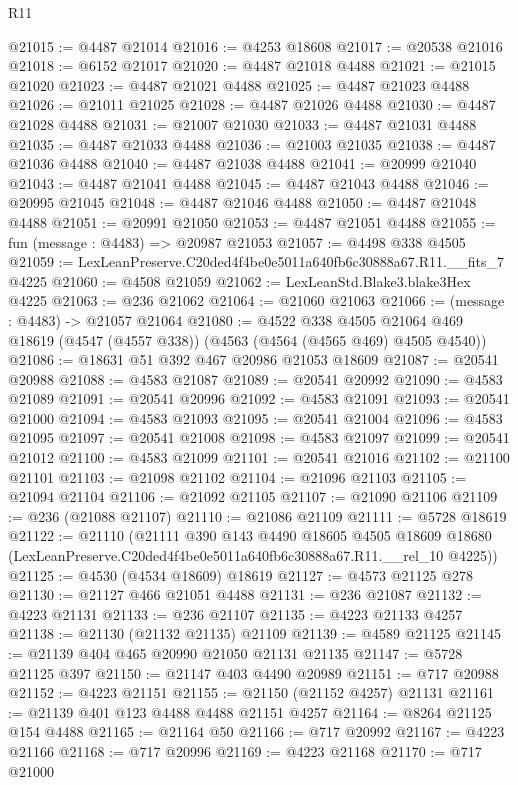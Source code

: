 \begin{lexlean}{R11}
\begin{coremodule}
@21015 := @4487 @21014
@21016 := @4253 @18608
@21017 := @20538 @21016
@21018 := @6152 @21017
@21020 := @4487 @21018 @4488
@21021 := @21015 @21020
@21023 := @4487 @21021 @4488
@21025 := @4487 @21023 @4488
@21026 := @21011 @21025
@21028 := @4487 @21026 @4488
@21030 := @4487 @21028 @4488
@21031 := @21007 @21030
@21033 := @4487 @21031 @4488
@21035 := @4487 @21033 @4488
@21036 := @21003 @21035
@21038 := @4487 @21036 @4488
@21040 := @4487 @21038 @4488
@21041 := @20999 @21040
@21043 := @4487 @21041 @4488
@21045 := @4487 @21043 @4488
@21046 := @20995 @21045
@21048 := @4487 @21046 @4488
@21050 := @4487 @21048 @4488
@21051 := @20991 @21050
@21053 := @4487 @21051 @4488
@21055 := fun (message : @4483) => @20987 @21053
@21057 := @4498 @338 @4505
@21059 := LexLeanPreserve.C20ded4f4be0e5011a640fb6c30888a67.R11.__fits_7 @4225
@21060 := @4508 @21059
@21062 := LexLeanStd.Blake3.blake3Hex @4225
@21063 := @236 @21062
@21064 := @21060 @21063
@21066 := (message : @4483) -> @21057 @21064
@21080 := @4522
    @338
    @4505
    @21064
    @469
    @18619
    (@4547 (@4557 @338))
    (@4563 (@4564 (@4565 @469) @4505 @4540))
@21086 := @18631 @51 @392 @467 @20986 @21053 @18609
@21087 := @20541 @20988
@21088 := @4583 @21087
@21089 := @20541 @20992
@21090 := @4583 @21089
@21091 := @20541 @20996
@21092 := @4583 @21091
@21093 := @20541 @21000
@21094 := @4583 @21093
@21095 := @20541 @21004
@21096 := @4583 @21095
@21097 := @20541 @21008
@21098 := @4583 @21097
@21099 := @20541 @21012
@21100 := @4583 @21099
@21101 := @20541 @21016
@21102 := @21100 @21101
@21103 := @21098 @21102
@21104 := @21096 @21103
@21105 := @21094 @21104
@21106 := @21092 @21105
@21107 := @21090 @21106
@21109 := @236 (@21088 @21107)
@21110 := @21086 @21109
@21111 := @5728 @18619
@21122 := @21110
    (@21111
      @390
      @143
      @4490
      @18605
      @4505
      @18609
      @18680
      (LexLeanPreserve.C20ded4f4be0e5011a640fb6c30888a67.R11.__rel_10 @4225))
@21125 := @4530 (@4534 @18609) @18619
@21127 := @4573 @21125 @278
@21130 := @21127 @466 @21051 @4488
@21131 := @236 @21087
@21132 := @4223 @21131
@21133 := @236 @21107
@21135 := @4223 @21133 @4257
@21138 := @21130 (@21132 @21135) @21109
@21139 := @4589 @21125
@21145 := @21139 @404 @465 @20990 @21050 @21131 @21135
@21147 := @5728 @21125 @397
@21150 := @21147 @403 @4490 @20989
@21151 := @717 @20988
@21152 := @4223 @21151
@21155 := @21150 (@21152 @4257) @21131
@21161 := @21139 @401 @123 @4488 @4488 @21151 @4257
@21164 := @8264 @21125 @154 @4488
@21165 := @21164 @50
@21166 := @717 @20992
@21167 := @4223 @21166
@21168 := @717 @20996
@21169 := @4223 @21168
@21170 := @717 @21000

\end{coremodule}
\end{lexlean}
